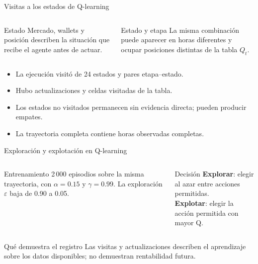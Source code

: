 \documentclass[10pt,aspectratio=169]{beamer}
\begin{document}
\begin{frame}{Visitas a los estados de Q-learning}
\begin{columns}[T,onlytextwidth]
\begin{block}{Estado}
\small Mercado, wallets y posición describen la situación que recibe el agente antes de actuar.
\end{block}
\begin{block}{Estado y etapa}
\small La misma combinación puede aparecer en horas diferentes y ocupar posiciones distintas de la tabla $Q_t$.
\end{block}
\end{columns}
\vspace{1em}
\begin{itemize}
\item La ejecución visitó \QEstadosVisitados{} de 24 estados y \QEstadosTemporales{} pares etapa--estado.
\item Hubo \QActualizaciones{} actualizaciones y \QCeldasVisitadas{} celdas visitadas de la tabla.
\item Los estados no visitados permanecen sin evidencia directa; pueden producir empates.
\item La trayectoria completa contiene \ObservacionesRL{} horas observadas completas.
\end{itemize}
\end{frame}

\begin{frame}{Exploración y explotación en Q-learning}
\begin{columns}[T,onlytextwidth]
\begin{block}{Entrenamiento}
\small 2\,000 episodios sobre la misma trayectoria, con $\alpha=0.15$ y $\gamma=0.99$.
La exploración $\varepsilon$ baja de 0.90 a 0.05.
\end{block}
\begin{block}{Decisión}
\small \textbf{Explorar}: elegir al azar entre acciones permitidas.\\[.5em]
\textbf{Explotar}: elegir la acción permitida con mayor Q.
\end{block}
\end{columns}
\vspace{1em}
\begin{alertblock}{Qué demuestra el registro}
Las visitas y actualizaciones describen el aprendizaje sobre los datos disponibles; no demuestran rentabilidad futura.
\end{alertblock}
\end{frame}
\end{document}
